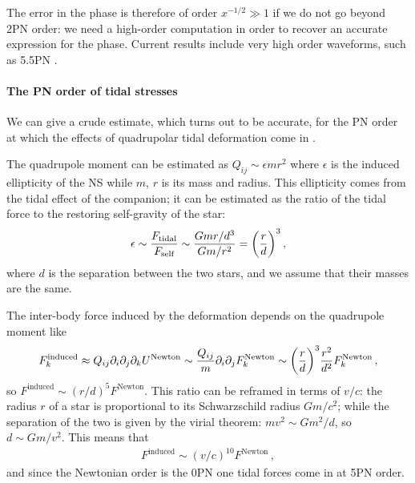 \documentclass[main.tex]{subfiles}
\begin{document}
The error in the phase is therefore of order \(x^{-1/2} \gg 1\) if we do not go beyond 2PN order: we need a high-order computation in order to recover an accurate expression for the phase. 
Current results include very high order waveforms, such as 5.5PN \cite[]{biniBinaryDynamicsFifth2020}.

\paragraph{The \ac{PN} order of tidal stresses}

We can give a crude estimate, which turns out to be accurate, for the \ac{PN} order at which the effects of quadrupolar tidal deformation come in \cite[pagg.\ 288--289]{maggioreGravitationalWavesVolume2007}. 

The quadrupole moment can be estimated as \(Q_{ij} \sim \epsilon mr^2\) where \(\epsilon \) is the induced ellipticity of the \ac{NS} while \(m\), \(r\) is its mass and radius.
This ellipticity comes from the tidal effect of the companion; it can be estimated as the ratio of the tidal force to the restoring self-gravity of the star: 
%
\begin{align}
\epsilon \sim \frac{F _{\text{tidal}}}{ F _{\text{self}}} \sim \frac{Gm r / d^3}{Gm / r^2} = \qty( \frac{r}{d})^3
\,,
\end{align}
%
where \(d\) is the separation between the two stars, and we assume that their masses are the same. 

The inter-body force induced by the deformation depends on the quadrupole moment like \cite[eqs.\ 5.219, 5.235]{maggioreGravitationalWavesVolume2007}
%
\begin{align}
F ^{\text{induced}}_k \approx Q_{ij} \partial_{i} \partial_{j} \partial_{k} U^{\text{Newton}} \sim \frac{Q_{ij}}{m} \partial_{i} \partial_{j} F^{\text{Newton}}_k \sim \qty( \frac{r}{d})^3 \frac{r^2}{d^2} F^{\text{Newton}}_k
\,,
\end{align}
%
so \(F^{\text{induced}} \sim (r/d)^{5} F^{\text{Newton}}\). 
This ratio can be reframed in terms of \(v/c\): the radius \(r\) of a star is proportional to its Schwarzschild radius \(Gm/c^2\); while the separation of the two is given by the virial theorem: \(m v^2 \sim Gm^2 /d\), so \(d \sim Gm / v^2\). This means that 
%
\begin{align}
F^{\text{induced}} \sim (v/c)^{10} F^{\text{Newton}}
\,,
\end{align}
%
and since the Newtonian order is the 0PN one tidal forces come in at 5PN order. 
\end{document}
